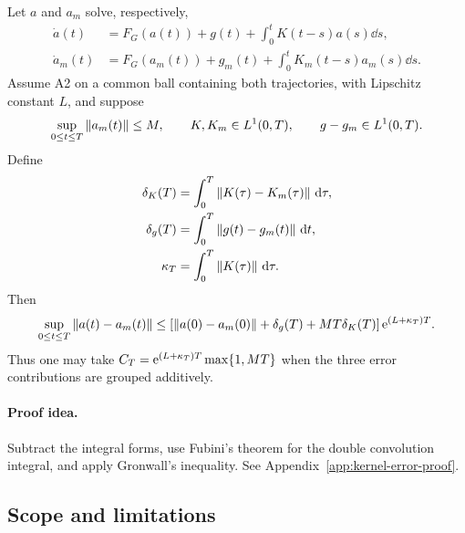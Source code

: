 \label{thm:kernel-error}
\begin{theoremseven}
Let $a$ and $a_m$ solve, respectively,
\begin{align}
 \dot a(t)
 &=F_G(a(t))+g(t)+\int_0^tK(t-s)a(s)\dd s,
 \label{eq:exact-volterra}\\
 \dot a_m(t)
 &=F_G(a_m(t))+g_m(t)+\int_0^tK_m(t-s)a_m(s)\dd s.
 \label{eq:approx-volterra}
\end{align}
Assume A2 on a common ball containing both trajectories, with Lipschitz
constant $L$, and suppose
\begin{equation}
 \sup_{0\le t\le T}\left\lVert a_m(t)\right\rVert\le M,\qquad
 K,K_m\in L^1(0,T),\qquad g-g_m\in L^1(0,T).
 \label{eq:kernel-error-assumptions}
\end{equation}
Define
\begin{align}
 \delta_K(T)&=\int_0^T\left\lVert K(\tau)-K_m(\tau)\right\rVert\,\mathrm{d}\tau,
 \label{eq:delta-k}\\
 \delta_g(T)&=\int_0^T\left\lVert g(t)-g_m(t)\right\rVert\,\mathrm{d} t,
 \label{eq:delta-g}\\
 \kappa_T&=\int_0^T\left\lVert K(\tau)\right\rVert\,\mathrm{d}\tau.
 \label{eq:kappa-t}
\end{align}
Then
\begin{equation}
 \sup_{0\le t\le T}\left\lVert a(t)-a_m(t)\right\rVert
 \le
 \left[
 \left\lVert a(0)-a_m(0)\right\rVert+\delta_g(T)+MT\delta_K(T)
 \right]\mathrm{e}^{(L+\kappa_T)T}.
 \label{eq:kernel-error-bound}
\end{equation}
Thus one may take
$C_T=\mathrm{e}^{(L+\kappa_T)T}\max\{1,MT\}$ when the three error contributions
are grouped additively.
\end{theoremseven}

\paragraph{Proof idea.}
Subtract the integral forms, use Fubini's theorem for the double convolution
integral, and apply Gronwall's inequality. See
Appendix~\ref{app:kernel-error-proof}.

\subsection{Scope and limitations}
\label{sec:limitations}


